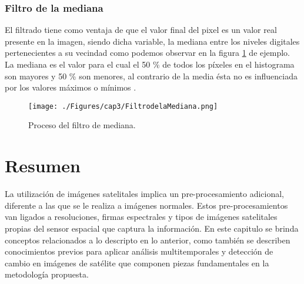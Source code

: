 \subsubsection{Filtro de la mediana}\label{subsec:filMediana}
El filtrado tiene como ventaja de que el valor final del pixel es un valor real presente en la imagen, siendo dicha variable, la mediana entre los niveles digitales pertenecientes a su vecindad como podemos observar en la figura \ref{fig:filMediata} de ejemplo. La mediana es el valor para el cual el 50 \% de todos los p\'ixeles en el histograma son mayores y 50 \% son menores, al contrario de la media \'esta no es influenciada por los valores m\'aximos o m\'inimos \cite{mehl1997fundamentos}.

    \begin{figure}[H]
    	\centering
    	\texttt{[image: ./Figures/cap3/FiltrodelaMediana.png]}
    	\caption{Proceso del filtro de mediana.}
    	\label{fig:filMediata}
    \end{figure}

\section{Resumen}

La utilizaci\'on de im\'agenes satelitales implica un pre-procesamiento adicional, diferente a las que se le realiza a im\'agenes normales. Estos pre-procesamientos van ligados a resoluciones, firmas espectrales y tipos de im\'agenes satelitales propias del sensor espacial que captura la informaci\'on. En este capitulo se brinda conceptos relacionados a lo descripto en lo anterior, como tambi\'en se describen conocimientos previos para aplicar an\'alisis multitemporales y detecci\'on de cambio en im\'agenes de sat\'elite que componen piezas fundamentales en la metodolog\'ia propuesta.